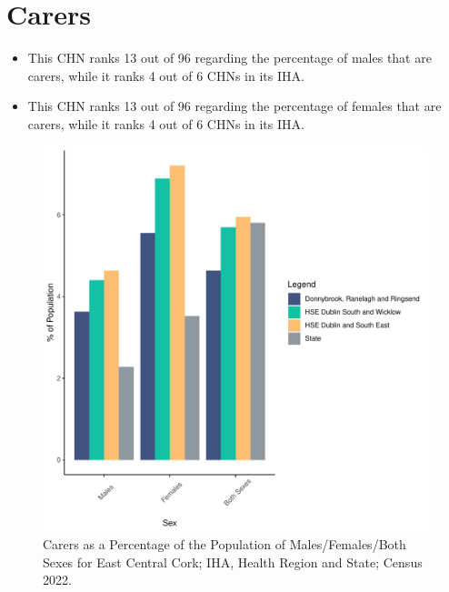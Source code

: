 \documentclass{article}
\begin{document}
\section{Carers}\label{sect:Carers}
\begin{itemize}
\item This CHN ranks  13 out of 96 regarding the percentage of males that are carers, while it ranks   4 out of 6 CHNs in its IHA.
\item This CHN ranks  13 out of 96 regarding the percentage of females that are carers, while it ranks   4 out of 6 CHNs in its IHA.
\end{itemize}
\begin{figure}[H]
	\centering
	\includegraphics[width = 150mm]{../figures/CareED.pdf}
	\caption{Carers as a Percentage of the Population of Males/Females/Both Sexes for East Central Cork; IHA, Health Region and State; Census 2022.}
	\label{fig:2ae19629-1a6a-13a3-e055-000000000001}
	\end{figure}
\end{document}
